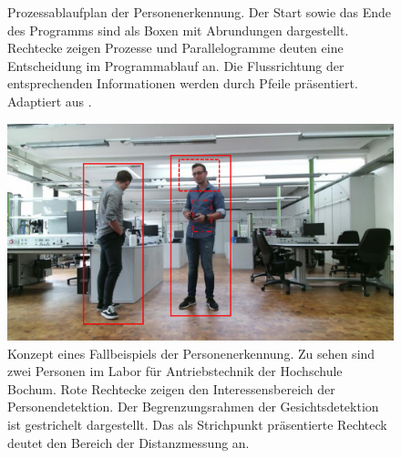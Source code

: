 \begin{figure}[H]
		\caption{Prozessablaufplan der Personenerkennung. Der Start sowie das Ende des Programms sind als Boxen mit Abrundungen dargestellt. Rechtecke zeigen Prozesse und Parallelogramme deuten eine Entscheidung im Programmablauf an. Die Flussrichtung der entsprechenden Informationen werden durch Pfeile präsentiert. Adaptiert aus \cite{texwelt}.}
		\label{fig: Personenerkennung}
	\end{figure}

	\begin{figure}[H]
		\centering
		\includegraphics[width=1\textwidth]{Bilder/person.pdf}
		\caption{Konzept eines Fallbeispiels der Personenerkennung. Zu sehen sind zwei Personen im Labor für Antriebstechnik der Hochschule Bochum. Rote Rechtecke zeigen den Interessensbereich der Personendetektion. Der Begrenzungsrahmen der Gesichtsdetektion ist gestrichelt dargestellt. Das als Strichpunkt präsentierte Rechteck deutet den Bereich der Distanzmessung an.}
		\label{fig: bbox}
	\end{figure}
	
